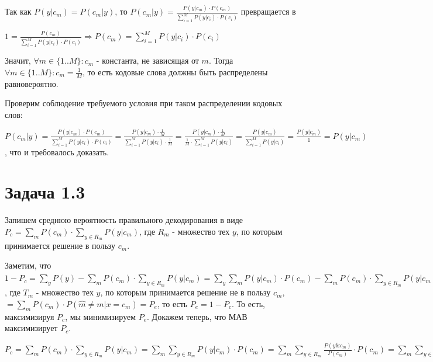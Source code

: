 \documentclass{article}
\begin{document}
	Так как $P(y|c_m) = P(c_m|y)$, то $P(c_m|y)= \frac{P(y|c_m) \cdot P(c_m)}{\sum\limits_{i = 1}^M P(y|c_i) \cdot P(c_i)}$ превращается в 
	
	$1 = \frac{P(c_m)}{\sum\limits_{i = 1}^M P(y|c_i) \cdot P(c_i)} \Rightarrow P(c_m) = \sum\limits_{i = 1}^M P(y|c_i) \cdot P(c_i)$
	
	Значит, $\forall m \in \{1..M\}: c_m$ - константа, не зависящая от $m$. Тогда $\forall m \in \{1..M\}: c_m = \frac{1}{M}$, то есть кодовые слова должны быть распределены равновероятно.
	
	Проверим соблюдение требуемого условия при таком распределении кодовых слов:
	
	 $P(c_m|y)= \frac{P(y|c_m) \cdot P(c_m)}{\sum\limits_{i = 1}^M P(y|c_i) \cdot P(c_i)} = \frac{P(y|c_m) \cdot \frac{1}{M}}{\sum\limits_{i = 1}^M P(y|c_i) \cdot \frac{1}{M}} = \frac{P(y|c_m) \cdot \frac{1}{M}}{\frac{1}{M} \cdot \sum\limits_{i = 1}^M P(y|c_i)} = \frac{P(y|c_m)}{\sum\limits_{i = 1}^M P(y|c_i)} =  \frac{P(y|c_m)}{1} = P(y|c_m)$, что и требовалось доказать.
	 
	 \section{Задача 1.3}
	 
	 Запишем среднюю вероятность правильного декодирования в виде $P_c = \sum\limits_m P(c_m) \cdot \sum\limits_{y \in R_m} P(y|c_m)$, где $R_m$ - множество тех $y$, по которым принимается решение в пользу $c_m$.
	 
	 Заметим, что $1 - P_c = \sum\limits_y P(y) -  \sum\limits_m P(c_m) \cdot \sum\limits_{y \in R_m} P(y|c_m) = \sum\limits_y \sum\limits_m P(y|c_m) \cdot P(c_m) -  \sum\limits_m P(c_m) \cdot \sum\limits_{y \in R_m} P(y|c_m) = \sum\limits_m \sum\limits_y P(y|c_m) \cdot P(c_m) -  \sum\limits_m P(c_m) \cdot \sum\limits_{y \in R_m} P(y|c_m) = \sum\limits_m P(c_m) \cdot \sum\limits_y P(y|c_m) -  \sum\limits_m P(c_m) \cdot \sum\limits_{y \in R_m} P(y|c_m) = \sum\limits_{m} P(c_m) \cdot (\sum\limits_y P(y|c_m) - \sum\limits_{y \in R_m} P(y|c_m)) =  \sum\limits_{m} P(c_m) \cdot \sum\limits_{y \in T_m} P(y|c_m)$, где $T_m$ - множество тех $y$, по которым принимается решение не в пользу $c_m$, $ = \sum\limits_m P(c_m) \cdot P(\hat{m} \neq m| x = c_m) = P_e$, то есть $P_e = 1 - P_c$. То есть, максимизируя $P_c$, мы минимизируем $P_e$. Докажем теперь, что МАВ максимизирует $P_c$.
	 
	 $P_c = \sum\limits_m P(c_m) \cdot \sum\limits_{y \in R_m} P(y|c_m) = \sum\limits_m \sum\limits_{y \in R_m} P(y|c_m) \cdot P(c_m) = \sum\limits_m \sum\limits_{y \in R_m} \frac{P(y \& c_m)}{P(c_m)} \cdot P(c_m) = \sum\limits_m \sum\limits_{y \in R_m} P(y \& c_m) = \sum\limits_m \sum\limits_{y \in R_m} \frac{P(y \& c_m)}{P(y)} \cdot P(y) = \sum\limits_m \sum\limits_{y \in R_m} P(c_m|y) \cdot P(y)$
	 
\end{document}
